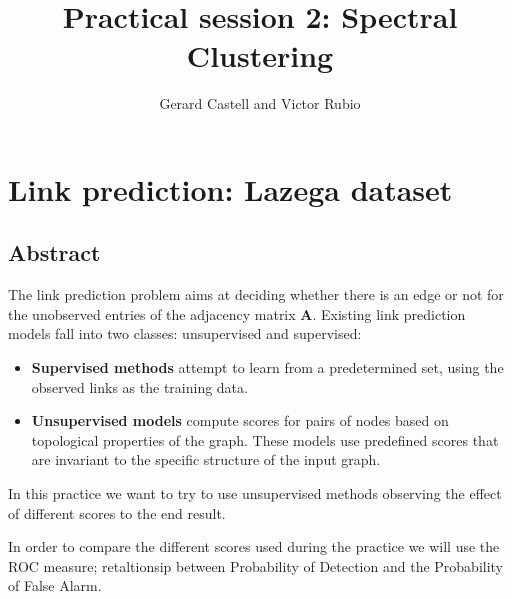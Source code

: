 \documentclass[12pt]{article}
\title{Practical session 2: Spectral Clustering}
\author{Gerard Castell and Victor Rubio}
\begin{document}
\maketitle

\thispagestyle{fancyplain}
\flushleft 


\Large
\hspace{10pt}
\small
\section{Link prediction: Lazega dataset}

\subsection{Abstract}
\justifying
The link prediction problem aims at deciding whether there is an edge or not for the unobserved entries of the adjacency matrix $\mathbf{A}$. Existing link prediction models fall into two classes: unsupervised and supervised:
\begin{itemize}
    \item \textbf{Supervised methods} attempt to learn from a predetermined set, using the observed links as the training data.
    \item \textbf{Unsupervised models} compute scores for pairs of nodes based on topological properties of the graph. These models use predefined scores that are invariant to the specific structure of the input graph.
\end{itemize}
In this practice we want to try to use unsupervised methods observing the effect of different scores to the end result.

In order to compare the different scores used during the practice we will use the ROC measure; retaltionsip between Probability of Detection and the Probability of False Alarm.
\end{document}
